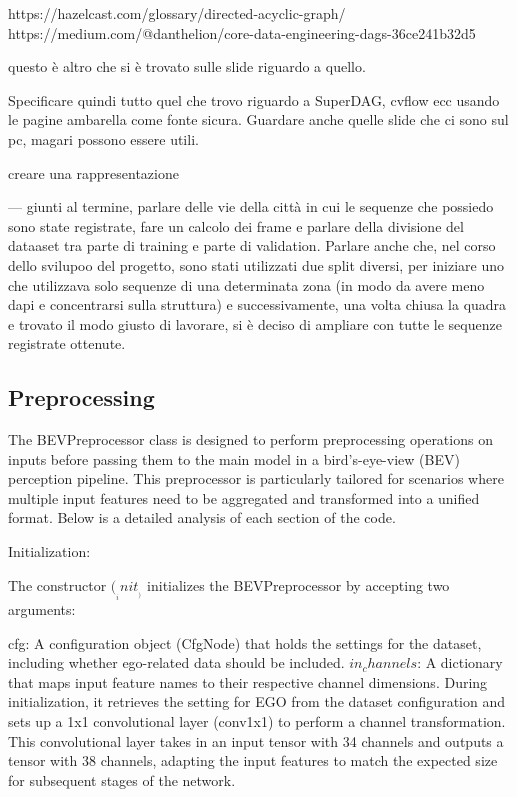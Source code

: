 https://hazelcast.com/glossary/directed-acyclic-graph/
https://medium.com/@danthelion/core-data-engineering-dags-36ce241b32d5

questo è altro che si è trovato sulle slide riguardo a quello. 

Specificare quindi tutto quel che trovo riguardo a SuperDAG, cvflow ecc usando le pagine ambarella come fonte sicura. Guardare anche quelle slide che ci sono sul pc, magari possono essere utili. 

creare una rappresentazione 


---
giunti al termine, parlare delle vie della città in cui le sequenze che possiedo sono state registrate, fare un calcolo dei frame e parlare della divisione del dataaset tra parte di training e parte di validation. Parlare anche che, nel corso dello svilupoo del progetto, sono stati utilizzati due split diversi, per iniziare uno che utilizzava solo sequenze di una determinata zona (in modo da avere meno dapi e concentrarsi sulla struttura) e successivamente, una volta chiusa la quadra e trovato il modo giusto di lavorare, si è deciso di ampliare con tutte le sequenze registrate ottenute. 








\subsection{Preprocessing}
The BEVPreprocessor class is designed to perform preprocessing operations on inputs before passing them to the main model in a bird's-eye-view (BEV) perception pipeline. This preprocessor is particularly tailored for scenarios where multiple input features need to be aggregated and transformed into a unified format. Below is a detailed analysis of each section of the code.

Initialization:

The constructor $(__init__)$ initializes the BEVPreprocessor by accepting two arguments:

cfg: A configuration object (CfgNode) that holds the settings for the dataset, including whether ego-related data should be included.
$in_channels$: A dictionary that maps input feature names to their respective channel dimensions.
During initialization, it retrieves the setting for EGO from the dataset configuration and sets up a 1x1 convolutional layer (conv1x1) to perform a channel transformation. This convolutional layer takes in an input tensor with 34 channels and outputs a tensor with 38 channels, adapting the input features to match the expected size for subsequent stages of the network.

